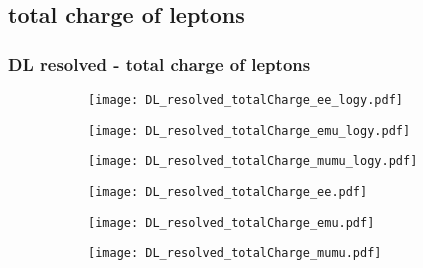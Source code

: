 \documentclass[aspectratio=169,8pt]{beamer}
\begin{document}
\subsection{total charge of leptons}
\begin{frame}
\frametitle{DL resolved - total charge of leptons}
\begin{figure}
\captionsetup[subfigure]{labelformat=empty}
\begin{subfigure}{0.32\textwidth}
\texttt{[image: DL\_resolved\_totalCharge\_ee\_logy.pdf]}
\vspace*{-0.15cm}
\end{subfigure}
\hfil
\begin{subfigure}{0.32\textwidth}
\texttt{[image: DL\_resolved\_totalCharge\_emu\_logy.pdf]}
\vspace*{-0.15cm}
\end{subfigure}
\hfil
\begin{subfigure}{0.32\textwidth}
\texttt{[image: DL\_resolved\_totalCharge\_mumu\_logy.pdf]}
\vspace*{-0.15cm}
\end{subfigure}
\hfil
\begin{subfigure}{0.32\textwidth}
\texttt{[image: DL\_resolved\_totalCharge\_ee.pdf]}
\vspace*{-0.15cm}
\end{subfigure}
\hfil
\begin{subfigure}{0.32\textwidth}
\texttt{[image: DL\_resolved\_totalCharge\_emu.pdf]}
\vspace*{-0.15cm}
\end{subfigure}
\hfil
\begin{subfigure}{0.32\textwidth}
\texttt{[image: DL\_resolved\_totalCharge\_mumu.pdf]}
\vspace*{-0.15cm}
\end{subfigure}
\hfil
\end{figure}
\end{frame}
\newpage
\end{document}

